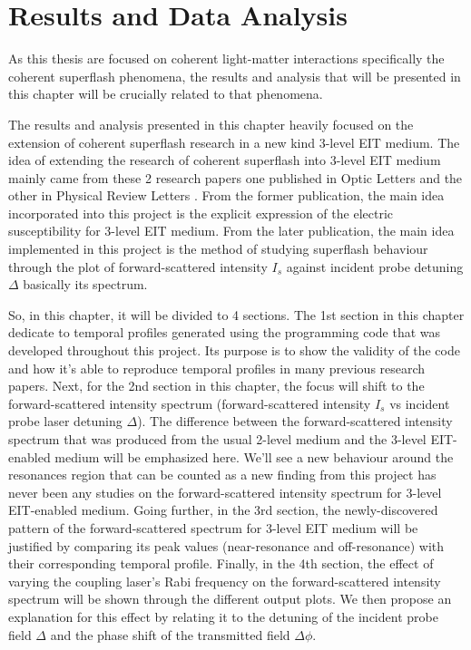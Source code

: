 \chapter{Results and Data Analysis}\label{results and analysis}
As this thesis are focused on coherent light-matter interactions specifically the coherent superflash phenomena, the results and analysis that will be presented in this chapter will be crucially related to that phenomena.

The results and analysis presented in this chapter heavily focused on the extension of coherent superflash research in a new kind 3-level EIT medium. The idea of extending the research of coherent superflash into 3-level EIT medium mainly came from these 2 research papers one published in Optic Letters \cite{jeong2010slow} and the other in Physical Review Letters \cite{Kwong2014}. From the former publication, the main idea incorporated into this project is the explicit expression of the electric susceptibility for 3-level EIT medium. From the later publication, the main idea implemented in this project is the method of studying superflash behaviour through the plot of forward-scattered intensity $I_{s}$ against incident probe detuning $\Delta$ basically its spectrum.

So, in this chapter, it will be divided to 4 sections. The 1st section in this chapter dedicate to temporal profiles generated using the programming code that was developed throughout this project. Its purpose is to show the validity of the code and how it's able to reproduce temporal profiles in many previous research papers. Next, for the 2nd section in this chapter, the focus will shift to the forward-scattered intensity spectrum (forward-scattered intensity $I_{s}$ vs incident probe laser detuning $\Delta$). The difference between the forward-scattered intensity spectrum that was produced from the usual 2-level medium and the 3-level EIT-enabled medium will be emphasized here. We'll see a new behaviour around the resonances region that can be counted as a new finding from this project has never been any studies on the forward-scattered intensity spectrum for 3-level EIT-enabled medium. Going further, in the 3rd section, the newly-discovered pattern of the forward-scattered spectrum for 3-level EIT medium will be justified by comparing its peak values (near-resonance and off-resonance) with their corresponding temporal profile. Finally, in the 4th section, the effect of varying the coupling laser's Rabi frequency on the forward-scattered intensity spectrum will be shown through the different output plots. We then propose an explanation for this effect by relating it to the detuning of the incident probe field $\Delta$ and the phase shift of the transmitted field $\Delta\phi$.



